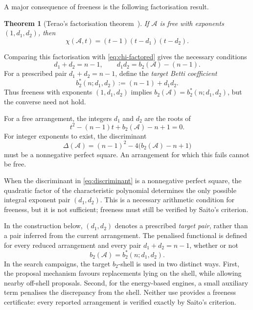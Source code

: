 \documentclass[pdflatex,sn-mathphys-num]{sn-jnl}%
\newtheorem{theorem}{Theorem}
\theoremstyle{remark}
\theoremstyle{definition}
\begin{document}
A major consequence of freeness is the following factorisation result.

\begin{theorem}[Terao's factorisation theorem~\cite{Terao1981}]
\label{thm:Terao-factorisation}
If $\mathcal{A}$ is free with exponents $(1,d_1,d_2)$, then
\[
\chi(\mathcal{A},t)=(t-1)(t-d_1)(t-d_2).
\]
\end{theorem}

Comparing this factorisation with \eqref{eq:chi-factored} gives the necessary conditions
\begin{equation}
\label{eq:exponent-relations}
d_1+d_2=n-1,
\qquad
d_1d_2=b_2(\mathcal{A})-(n-1).
\end{equation}
For a prescribed pair $d_1+d_2=n-1$, define the \emph{target Betti coefficient}
\begin{equation}
\label{eq:b2-target}
b_2^*(n;d_1,d_2):=(n-1)+d_1d_2.
\end{equation}
Thus freeness with exponents $(1,d_1,d_2)$ implies $b_2(\mathcal{A})=b_2^*(n;d_1,d_2)$, but the converse need not hold.

For a free arrangement, the integers $d_1$ and $d_2$ are the roots of
\[
t^2-(n-1)t+b_2(\mathcal{A})-n+1=0.
\]
For integer exponents to exist, the discriminant
\begin{equation}
\label{eq:discriminant}
\Delta(\mathcal{A})
=(n-1)^2-4\bigl(b_2(\mathcal{A})-n+1\bigr)
\end{equation}
must be a nonnegative perfect square. An arrangement for which this fails cannot be free.

When the discriminant in \eqref{eq:discriminant} is a nonnegative perfect square, the quadratic factor of the characteristic polynomial determines the only possible integral exponent pair $(d_1,d_2)$. This is a necessary arithmetic condition for freeness, but it is not sufficient; freeness must still be verified by Saito's criterion.

In the construction below, $(d_1,d_2)$ denotes a prescribed \emph{target pair}, rather than a pair inferred from the current arrangement. The penalised functional is defined for every reduced arrangement and every
pair $d_1+d_2=n-1$, whether or not
\[
b_2(\mathcal{A})=b_2^*(n;d_1,d_2).
\]
In the search campaigns, the target $b_2$-shell is used in two distinct ways. First, the proposal mechanism favours replacements lying on the shell, while allowing nearby off-shell proposals. Second, for the energy-based engines, a small auxiliary term penalises the discrepancy from the shell. Neither use provides a freeness certificate: every reported arrangement is verified exactly by Saito's criterion.
\end{document}
